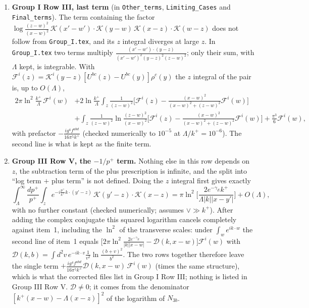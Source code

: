 \documentclass[10pt]{article}
\newcommand{\K}{\mathcal{K}}
\begin{document}
\begin{enumerate}
\item \textbf{Group I Row III, last term} (in \texttt{Other\_terms}, \texttt{Limiting\_Cases} and \texttt{Final\_terms}). The term containing the factor $\log\frac{(z-w)^{2}}{(x-w)^{2}}\,\K(x'-w')\!\cdot\!\K(y-w)\,\K(x-z)\!\cdot\!\K(w-z)$ does not follow from \texttt{Group\_I.tex}, and its $z$ integral diverges at large $z$. In \texttt{Group\_I.tex} two terms multiply $\frac{(x'-w')\cdot(y-z)}{(x'-w')^{2}(y-z)^{2}(z-w)^{2}}$; only their sum, with $\Lambda$ kept, is integrable. With $\mathcal{F}^{i}(z)=\K^{i}(y-z)[U^{bc}(z)-U^{bc}(y)]\rho^{c}(y)$ the $z$ integral of the pair is, up to $O(\Lambda)$,
\begin{align*}
2\pi\ln^{2}\!\frac{k^{+}}{\Lambda}\,\mathcal{F}^{i}(w)
&+2\ln\frac{k^{+}}{\Lambda}\int_{z}\frac{1}{(z-w)^{2}}\Big[\mathcal{F}^{i}(z)-\tfrac{(x-w)^{2}}{(x-w)^{2}+(z-w)^{2}}\mathcal{F}^{i}(w)\Big]\\
&+\int_{z}\frac{1}{(z-w)^{2}}\ln\frac{(z-w)^{2}}{(x-w)^{2}}\Big[\mathcal{F}^{i}(z)-\tfrac{(x-w)^{2}}{(x-w)^{2}+(z-w)^{2}}\mathcal{F}^{i}(w)\Big]+\frac{\pi^{3}}{6}\mathcal{F}^{i}(w),
\end{align*}
with prefactor $-\frac{ig^{4}f^{abd}}{16\pi^{5}k^{+}}$ (checked numerically to $10^{-5}$ at $\Lambda/k^{+}=10^{-6}$). The second line is what is kept as the finite term.
\item \textbf{Group III Row V, the $-1/p^{+}$ term.} Nothing else in this row depends on $z$, the subtraction term of the plus prescription is infinite, and the split into ``log term $+$ plus term'' is not defined. Doing the $z$ integral first gives exactly
\[
\int_{\Lambda}^{\infty}\frac{dp^{+}}{p^{+}}\int_{z}e^{-i\frac{p^{+}}{k^{+}}k\cdot(y'-z)}\,\K(y'-z)\!\cdot\!\K(x-z)=\pi\ln^{2}\!\Big[\frac{2e^{-\gamma_{E}}k^{+}}{\Lambda|k||x-y'|}\Big]+O(\Lambda),
\]
with no further constant (checked numerically; assumes $\vee\gg k^{+}$). After adding the complex conjugate this squared logarithm cancels completely against item~1, including the $\ln^{2}$ of the transverse scales: under $\int_{w}e^{ik\cdot w}$ the second line of item~1 equals $\big[2\pi\ln^{2}\frac{2e^{-\gamma_{E}}}{|k||x-w|}-\mathcal{D}(k,x-w)\big]\mathcal{F}^{i}(w)$ with $\mathcal{D}(k,b)=\int d^{2}v\,e^{-ik\cdot v}\frac{1}{v^{2}}\ln\frac{(b+v)^{2}}{b^{2}}$. The two rows together therefore leave the single term $+\frac{ig^{4}f^{abd}}{16\pi^{5}k^{+}}\mathcal{D}(k,x-w)\,\mathcal{F}^{i}(w)$ (times the same structure), which is what the corrected files list in Group I Row III; nothing is listed in Group III Row V. $\mathcal{D}\neq0$; it comes from the denominator $[k^{+}(x-w)-\Lambda(x-z)]^{2}$ of the logarithm of $N_{3b}$.

\end{enumerate}
\end{document}
